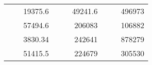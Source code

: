 \begin{table}[H]
\begin{tabular}{|ccrccrccc}
\rowcolor[HTML]{DDFDFF} 
\multicolumn{1}{|c|}{\cellcolor[HTML]{FFFFC7}}                                & \multicolumn{1}{c|}{\cellcolor[HTML]{DDFDFF}}                      & \multicolumn{1}{r|}{\cellcolor[HTML]{DAE8FC}19375.6}   & \multicolumn{1}{c|}{\cellcolor[HTML]{FFFFC7}}                                & \multicolumn{1}{c|}{\cellcolor[HTML]{DDFDFF}}                       & \multicolumn{1}{r|}{\cellcolor[HTML]{DDFDFF}49241.6}   & \multicolumn{1}{c|}{\cellcolor[HTML]{FFFFC7}}                                & \multicolumn{1}{c|}{\cellcolor[HTML]{DDFDFF}}                      & \multicolumn{1}{r|}{\cellcolor[HTML]{DDFDFF}496973}    \\ \cline{3-3} \cline{6-6} \cline{9-9} 
\multicolumn{1}{|c|}{\cellcolor[HTML]{FFFFC7}}                                & \multicolumn{1}{c|}{\cellcolor[HTML]{DDFDFF}}                      & \multicolumn{1}{r|}{\cellcolor[HTML]{DDFDFF}57494.6}   & \multicolumn{1}{c|}{\cellcolor[HTML]{FFFFC7}}                                & \multicolumn{1}{c|}{\cellcolor[HTML]{DDFDFF}}                       & \multicolumn{1}{r|}{\cellcolor[HTML]{DAE8FC}206083}    & \multicolumn{1}{c|}{\cellcolor[HTML]{FFFFC7}}                                & \multicolumn{1}{c|}{\cellcolor[HTML]{DDFDFF}}                      & \multicolumn{1}{r|}{\cellcolor[HTML]{DAE8FC}106882}    \\ \cline{3-3} \cline{6-6} \cline{9-9} 
\rowcolor[HTML]{DDFDFF} 
\multicolumn{1}{|c|}{\cellcolor[HTML]{FFFFC7}}                                & \multicolumn{1}{c|}{\cellcolor[HTML]{DDFDFF}}                      & \multicolumn{1}{r|}{\cellcolor[HTML]{DAE8FC}3830.34}   & \multicolumn{1}{c|}{\cellcolor[HTML]{FFFFC7}}                                & \multicolumn{1}{c|}{\cellcolor[HTML]{DDFDFF}}                       & \multicolumn{1}{r|}{\cellcolor[HTML]{DDFDFF}242641}    & \multicolumn{1}{c|}{\cellcolor[HTML]{FFFFC7}}                                & \multicolumn{1}{c|}{\cellcolor[HTML]{DDFDFF}}                      & \multicolumn{1}{r|}{\cellcolor[HTML]{DDFDFF}878279}    \\ \cline{3-3} \cline{6-6} \cline{9-9} 
\multicolumn{1}{|c|}{\cellcolor[HTML]{FFFFC7}}                                & \multicolumn{1}{c|}{\cellcolor[HTML]{DDFDFF}}                      & \multicolumn{1}{r|}{\cellcolor[HTML]{DDFDFF}51415.5}   & \multicolumn{1}{c|}{\cellcolor[HTML]{FFFFC7}}                                & \multicolumn{1}{c|}{\cellcolor[HTML]{DDFDFF}}                       & \multicolumn{1}{r|}{\cellcolor[HTML]{DAE8FC}224679}    & \multicolumn{1}{c|}{\cellcolor[HTML]{FFFFC7}}                                & \multicolumn{1}{c|}{\cellcolor[HTML]{DDFDFF}}                      & \multicolumn{1}{r|}{\cellcolor[HTML]{DAE8FC}305530}    \\ \cline{3-3} \cline{6-6} \cline{9-9} 

\end{tabular}
\end{table}
